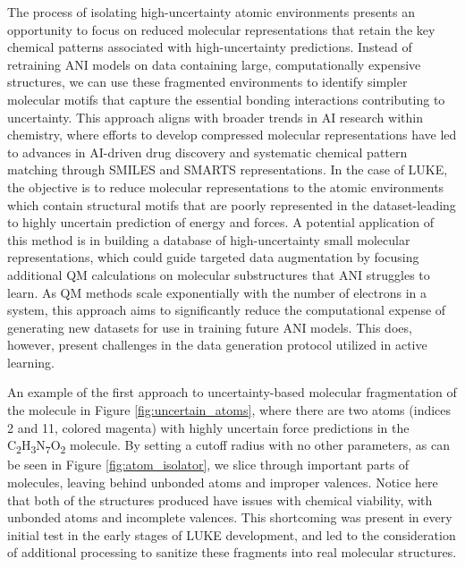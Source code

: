 The process of isolating high-uncertainty atomic environments presents an opportunity to focus on reduced molecular representations that retain the key chemical patterns associated with high-uncertainty predictions. 
Instead of retraining ANI models on data containing large, computationally expensive structures, we can use these fragmented environments to identify simpler molecular motifs that capture the essential bonding interactions contributing to uncertainty. 
This approach aligns with broader trends in AI research within chemistry, where efforts to develop compressed molecular representations have led to advances in AI-driven drug discovery \cite{mol_reps_in_AI_drug_discovery_david} and systematic chemical pattern matching \cite{SMILES_pair_encoding_li, mol_patterns_SMARTS_schmidt, automated_fragment_gen_smiles_bilsland} through SMILES \cite{smiles} and SMARTS \cite{smarts} representations.
In the case of LUKE, the objective is to reduce molecular representations to the atomic environments which contain structural motifs that are poorly represented in the dataset-leading to highly uncertain prediction of energy and forces. 
A potential application of this method is in building a database of high-uncertainty small molecular representations, which could guide targeted data augmentation by focusing additional QM calculations on molecular substructures that ANI struggles to learn. 
As QM methods scale exponentially with the number of electrons in a system, this approach aims to significantly reduce the computational expense of generating new datasets for use in training future ANI models.
This does, however, present challenges in the data generation protocol utilized in active learning.

An example of the first approach to uncertainty-based molecular fragmentation of the molecule in Figure \ref{fig:uncertain_atoms}, where there are two atoms (indices 2 and 11, colored magenta) with highly uncertain force predictions in the C\textsubscript{2}H\textsubscript{3}N\textsubscript{7}O\textsubscript{2} molecule.
By setting a cutoff radius with no other parameters, as can be seen in Figure \ref{fig:atom_isolator}, we slice through important parts of molecules, leaving behind unbonded atoms and improper valences.
Notice here that both of the structures produced have issues with chemical viability, with unbonded atoms and incomplete valences.
This shortcoming was present in every initial test in the early stages of LUKE development, and led to the consideration of additional processing to sanitize these fragments into real molecular structures. 


